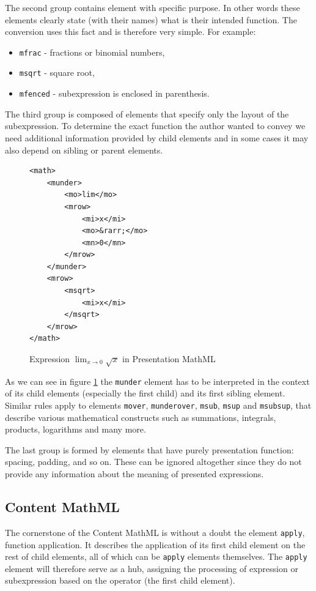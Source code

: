 \documentclass[11pt,oneside,final]{fithesis2}
\begin{document}
The second group contains element with specific purpose. In other words these elements clearly state (with their names) what is their intended function. The conversion uses this fact and is therefore very simple. For example:
\begin{itemize}
\item \texttt{mfrac} - fractions or binomial numbers,
\item \texttt{msqrt} - square root,
\item \texttt{mfenced} - subexpression is enclosed in parenthesis.
\end{itemize}

The third group is composed of elements that specify only the layout of the subexpression. To determine the exact function the author wanted to convey we need additional information provided by child elements and in some cases it may also depend on sibling or parent elements. 
\begin{figure}[!ht]
\lstset{language=XML,frame=lines}
\begin{lstlisting}
<math>
	<munder>
		<mo>lim</mo>
		<mrow>
			<mi>x</mi>
			<mo>&rarr;</mo>
			<mn>0</mn>
		</mrow>		
	</munder>
	<mrow>
		<msqrt>
			<mi>x</mi>
		</msqrt>
	</mrow>
</math>
\end{lstlisting}
\caption{Expression $\lim_{x \to 0}\sqrt{x}$ in Presentation MathML}
\label{fig:mathmllimit}
\end{figure}

As we can see in figure \ref{fig:mathmllimit} the \texttt{munder} element has to be interpreted in the context of its child elements (especially the first child) and its first sibling element. Similar rules apply to elements \texttt{mover}, \texttt{munderover}, \texttt{msub}, \texttt{msup} and \texttt{msubsup}, that describe various mathematical constructs such as summations, integrals, products, logarithms and many more.

The last group is formed by elements that have purely presentation function: spacing, padding, and so on. These can be ignored altogether since they do not provide any information about the meaning of presented expressions.


\subsection{Content MathML}
\label{analysis-content}
The cornerstone of the Content MathML is without a doubt the element \texttt{apply}, function application. It describes the application of its first child element on the rest of child elements, all of which can be \texttt{apply} elements themselves. The \texttt{apply} element will therefore serve as a hub, assigning the processing of expression or subexpression based on the operator (the first child element).
\end{document}
